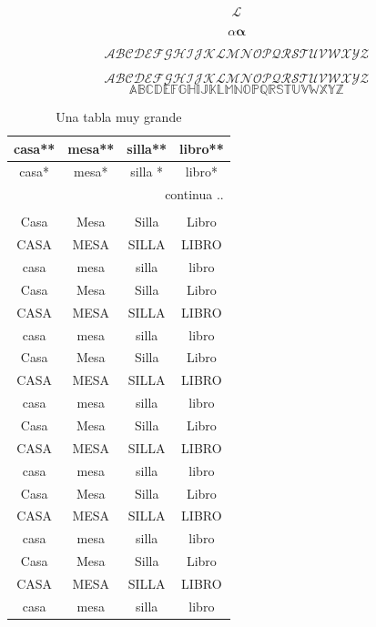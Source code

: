 \documentclass{report}
\begin{document}

$$
\mathcal{L}
$$

$$
\alpha \bm{\alpha}
$$


$$
\mathcal{ABCDEFGHIJKLMNOPQRSTUVWXYZ}
$$

$$
\mathscr{ABCDEFGHIJKLMNOPQRSTUVWXYZ}%
$$
$$
\mathds{ABCDEFGHIJKLMNOPQRSTUVWXYZ}
$$


\begin{longtable}[r]{cccc}
	\caption{Una tabla muy grande}\\
	\hline
	casa** & mesa** & silla** & libro** \\
	\endfirsthead
	casa* & mesa* & silla * & libro* \\%
	\hline
	\endhead
	\multicolumn{4}{r}{continua ..}\\
	\endfoot
	\multicolumn{4}{r}{fin.}\\
	\endlastfoot
	Casa & Mesa & Silla & Libro \\
	CASA & MESA & SILLA & LIBRO \\
	casa & mesa & silla & libro \\
	Casa & Mesa & Silla & Libro \\
	\pagebreak%
	CASA & MESA & SILLA & LIBRO \\
	casa & mesa & silla & libro \\
	Casa & Mesa & Silla & Libro \\
	CASA & MESA & SILLA & LIBRO \\
	casa & mesa & silla & libro \\
	Casa & Mesa & Silla & Libro \\
	CASA & MESA & SILLA & LIBRO \\
	casa & mesa & silla & libro \\
	Casa & Mesa & Silla & Libro \\
	CASA & MESA & SILLA & LIBRO \\
	casa & mesa & silla & libro \\
	Casa & Mesa & Silla & Libro \\
	CASA & MESA & SILLA & LIBRO \\
	casa & mesa & silla & libro \\

\end{longtable}
\end{document}
